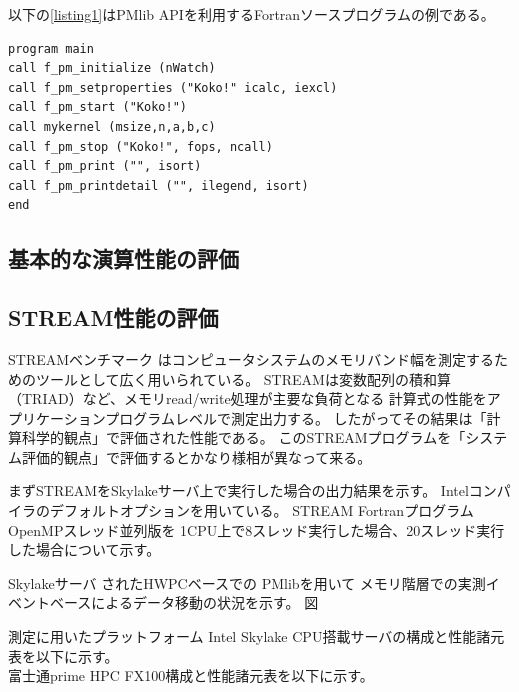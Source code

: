 \documentclass[submit,techrep,noauthor]{ipsj}
\begin{document}
以下の\lstlistingname \ref{listing1}はPMlib APIを利用するFortranソースプログラムの例である。

\begin{lstlisting}[caption={\hfill},label={listing1},captionpos=t]
program main
call f_pm_initialize (nWatch)
call f_pm_setproperties ("Koko!" icalc, iexcl)
call f_pm_start ("Koko!")
call mykernel (msize,n,a,b,c)
call f_pm_stop ("Koko!", fops, ncall)
call f_pm_print ("", isort)
call f_pm_printdetail ("", ilegend, isort)
end
\end{lstlisting}

\subsection{基本的な演算性能の評価}
\subsection{STREAM性能の評価}
STREAMベンチマーク\cite{stream:1995}
はコンピュータシステムのメモリバンド幅を測定するためのツールとして広く用いられている。
STREAMは変数配列の積和算（TRIAD）など、メモリread/write処理が主要な負荷となる
計算式の性能をアプリケーションプログラムレベルで測定出力する。
したがってその結果は「計算科学的観点」で評価された性能である。
このSTREAMプログラムを「システム評価的観点」で評価するとかなり様相が異なって来る。

まずSTREAMをSkylakeサーバ上で実行した場合の出力結果を示す。
Intelコンパイラのデフォルトオプションを用いている。
STREAM FortranプログラムOpenMPスレッド並列版を
1CPU上で8スレッド実行した場合、20スレッド実行した場合について示す。


Skylakeサーバ
されたHWPCベースでの
PMlibを用いて
メモリ階層での実測イベントベースによるデータ移動の状況を示す。
図


測定に用いたプラットフォーム
Intel Skylake CPU搭載サーバの構成と性能諸元表を以下に示す。\\
富士通prime HPC FX100構成と性能諸元表を以下に示す。\\
\end{document}
